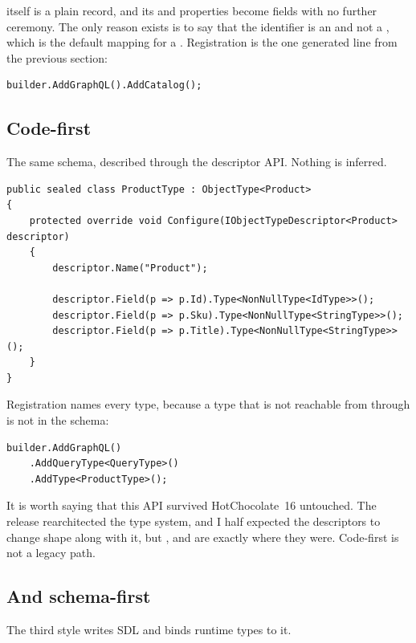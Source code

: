  itself is a plain record, and its  and 
properties become fields with no further ceremony. The only reason
 exists is to say that the identifier is an  and not
a , which is the default mapping for a . Registration is
the one generated line from the previous section:

\begin{verbatim}
builder.AddGraphQL().AddCatalog();
\end{verbatim}

\subsection*{Code-first}

%
The same schema, described through the descriptor API. Nothing is inferred.

\begin{verbatim}
public sealed class ProductType : ObjectType<Product>
{
    protected override void Configure(IObjectTypeDescriptor<Product> descriptor)
    {
        descriptor.Name("Product");

        descriptor.Field(p => p.Id).Type<NonNullType<IdType>>();
        descriptor.Field(p => p.Sku).Type<NonNullType<StringType>>();
        descriptor.Field(p => p.Title).Type<NonNullType<StringType>>();
    }
}
\end{verbatim}

Registration names every type, because a type that is not reachable from
 through  is not in the schema:

\begin{verbatim}
builder.AddGraphQL()
    .AddQueryType<QueryType>()
    .AddType<ProductType>();
\end{verbatim}

It is worth saying that this API survived HotChocolate~16 untouched. The release
rearchitected the type system, and I half expected the descriptors to change
shape along with it, but ,
 and  are exactly where they were.
Code-first is not a legacy path.

\subsection*{And schema-first}

%
The third style writes SDL and binds runtime types to it.

